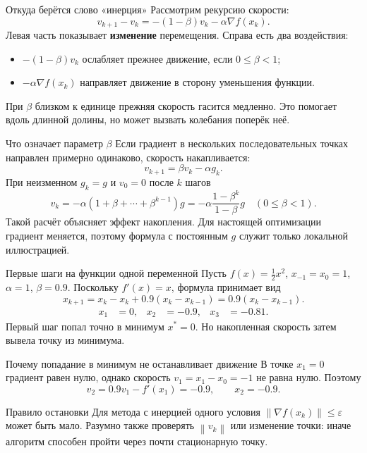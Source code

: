 \documentclass[aspectratio=169,10pt]{beamer}
\newcommand{\norm}[1]{\left\lVert #1\right\rVert}
\newcommand{\grad}{\nabla}
\begin{document}
\begin{frame}{Откуда берётся слово «инерция»}
\small
Рассмотрим рекурсию скорости:
\[
v_{k+1}-v_k=-(1-\beta)v_k-\alpha\grad f(x_k).
\]
Левая часть показывает \textbf{изменение} перемещения. Справа есть два воздействия:
\begin{itemize}
\item $-(1-\beta)v_k$ ослабляет прежнее движение, если $0\le\beta<1$;
\item $-\alpha\grad f(x_k)$ направляет движение в сторону уменьшения функции.
\end{itemize}
При $\beta$ близком к единице прежняя скорость гасится медленно. Это помогает вдоль длинной долины, но может вызвать колебания поперёк неё.
\end{frame}

\begin{frame}{Что означает параметр $\beta$}
\small
Если градиент в нескольких последовательных точках направлен примерно одинаково, скорость накапливается:
\[
v_{k+1}=\beta v_k-\alpha g_k .
\]
При неизменном $g_k=g$ и $v_0=0$ после $k$ шагов
\[
v_k=-\alpha(1+\beta+\cdots+\beta^{k-1})g
     =-\alpha\frac{1-\beta^k}{1-\beta}g
\quad (0\le\beta<1).
\]
Такой расчёт объясняет эффект накопления. Для настоящей оптимизации градиент меняется, поэтому формула с постоянным $g$ служит только локальной иллюстрацией.
\end{frame}

\begin{frame}{Первые шаги на функции одной переменной}
\small
Пусть $f(x)=\tfrac12x^2$, $x_{-1}=x_0=1$, $\alpha=1$, $\beta=0.9$.
Поскольку $f'(x)=x$, формула принимает вид
\[
x_{k+1}=x_k-x_k+0.9(x_k-x_{k-1})
       =0.9(x_k-x_{k-1}).
\]
\begin{align*}
x_1&=0,& x_2&=-0.9,& x_3&=-0.81.
\end{align*}
Первый шаг попал точно в минимум $x^*=0$. Но накопленная скорость затем вывела точку из минимума.
\end{frame}

\begin{frame}{Почему попадание в минимум не останавливает движение}
\small
В точке $x_1=0$ градиент равен нулю, однако скорость $v_1=x_1-x_0=-1$ не равна нулю. Поэтому
\[
v_2=0.9v_1-f'(x_1)=-0.9,\qquad x_2=-0.9.
\]
\begin{alertblock}{Правило остановки}
Для метода с инерцией одного условия $\norm{\grad f(x_k)}\le\varepsilon$ может быть мало. Разумно также проверять $\norm{v_k}$ или изменение точки: иначе алгоритм способен пройти через почти стационарную точку.
\end{alertblock}
\end{frame}
\end{document}
